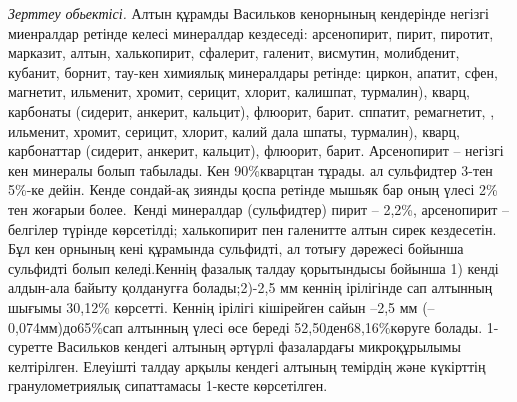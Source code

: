 \begin{multicols}{2}
\emph{Зерттеу обьектісі.} Алтын құрамды Васильков кенорнының кендерінде
негізгі миенралдар ретінде келесі минералдар кездеседі: арсенопирит,
пирит, пиротит, марказит, алтын, халькопирит, сфалерит, галенит,
висмутин, молибденит, кубанит, борнит, тау-кен химиялық минералдары
ретінде: циркон, апатит, сфен, магнетит, ильменит, хромит, серицит,
хлорит, калишпат, турмалин), кварц, карбонаты (сидерит, анкерит,
кальцит), флюорит, барит. сппатит, ремагнетит, , ильменит, хромит,
серицит, хлорит, калий дала шпаты, турмалин), кварц, карбонаттар
(сидерит, анкерит, кальцит), флюорит, барит. Арсенопирит -- негізгі кен
минералы болып табылады. Кен 90\%кварцтан тұрады. ал сульфидтер 3-тен
5\%-ке дейін. Кенде сондай-ақ зиянды қоспа ретінде мышьяк бар оның үлесі
2\% тен жоғарыи более.~Кенді минералдар (сульфидтер) пирит -- 2,2\%,
арсенопирит -- белгілер түрінде көрсетілді; халькопирит пен галенитте
алтын сирек кездесетін. Бұл кен орнының кені құрамында сульфидті, ал
тотығу дәрежесі бойынша сульфидті болып келеді.Кеннің фазалық талдау
қорытындысы бойынша 1) кенді алдын-ала байыту қолданугға болады;2)-2,5
мм кеннің ірілігінде сап алтынның шығымы 30,12\% көрсетті. Кеннің
ірілігі кішірейген сайын --2,5 мм (--0,074мм)до65\%сап алтынның үлесі
өсе береді 52,50ден68,16\%көруге болады. 1-суретте Васильков кендегі
алтының әртүрлі фазалардағы микроқұрылымы келтірілген. Елеуішті талдау
арқылы кендегі алтының темірдің және күкірттің гранулометриялық
сипаттамасы 1-кесте көрсетілген.
\end{multicols}


